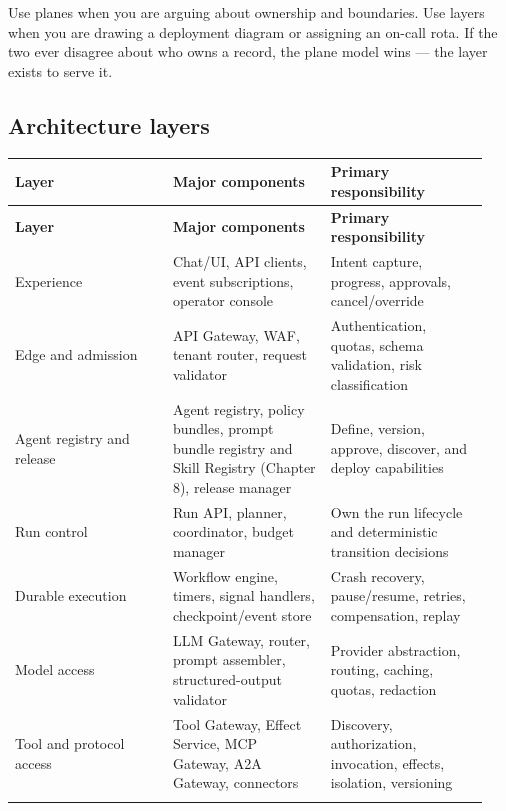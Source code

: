 Use planes when you are arguing about ownership and boundaries. Use layers when you are drawing a deployment diagram or assigning an on-call rota. If the two ever disagree about who owns a record, the plane model wins — the layer exists to serve it.\par

\subsection{Architecture layers}

\BookTableStart
\small
\begin{longtable}{@{}Y{0.3133\linewidth}Y{0.3133\linewidth}Y{0.3133\linewidth}@{}}
\color{white}\bfseries \textbf{Layer} & \color{white}\bfseries \textbf{Major components} & \color{white}\bfseries \textbf{Primary responsibility} \\
\endfirsthead
{}
\color{white}\bfseries \textbf{Layer} & \color{white}\bfseries \textbf{Major components} & \color{white}\bfseries \textbf{Primary responsibility} \\
\endhead
Experience & Chat/UI, API clients, event subscriptions, operator console & Intent capture, progress, approvals, cancel/override \\
Edge and admission & API Gateway, WAF, tenant router, request validator & Authentication, quotas, schema validation, risk classification \\
Agent registry and release & Agent registry, policy bundles, prompt bundle registry and Skill Registry (Chapter 8), release manager & Define, version, approve, discover, and deploy capabilities \\
Run control & Run API, planner, coordinator, budget manager & Own the run lifecycle and deterministic transition decisions \\
Durable execution & Workflow engine, timers, signal handlers, checkpoint/event store & Crash recovery, pause/resume, retries, compensation, replay \\
Model access & LLM Gateway, router, prompt assembler, structured-output validator & Provider abstraction, routing, caching, quotas, redaction \\
Tool and protocol access & Tool Gateway, Effect Service, MCP Gateway, A2A Gateway, connectors & Discovery, authorization, invocation, effects, isolation, versioning \\

\end{longtable}

